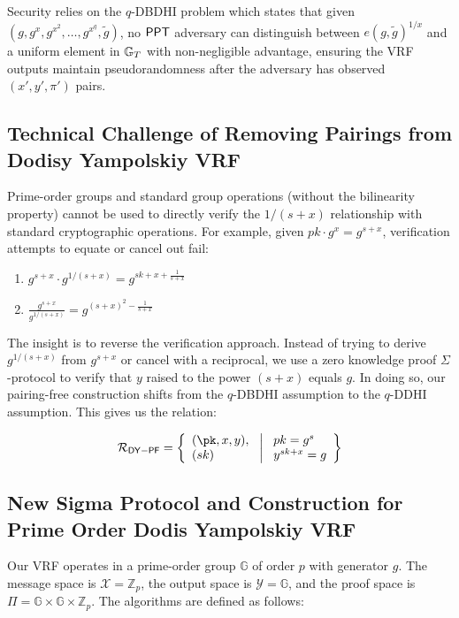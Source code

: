 Security relies on the $q$-DBDHI problem which states that given $(g, g^x, g^{x^2}, \ldots, g^{x^q}, \tilde{g})$, no $\mathsf{PPT}$ adversary can distinguish between $e(g,\tilde{g})^{1/x}$ and a uniform element in $\mathbb{G}_T$ with non-negligible advantage, ensuring the VRF outputs maintain pseudorandomness after the adversary has observed $(x',y',\pi')$ pairs.

\subsection{Technical Challenge of Removing Pairings from Dodisy Yampolskiy VRF}

Prime-order groups and standard group operations (without the bilinearity property) cannot be used to directly verify the $1/(s+x)$ relationship with standard cryptographic operations. For example, given $pk  \cdot g^x = g^{s+x}$, verification attempts to equate or cancel out fail:

\begin{enumerate}
    \item $g^{s+x} \cdot g^{1/(s+x)} = g^{sk + x + \frac{1}{s+x}}$
    \item $\frac{g^{s+x}}{g^{1/(s+x)}} = g^{(s+x)^2-\frac{1}{s+x}}$
\end{enumerate}

The insight is to reverse the verification approach. Instead of trying to derive $g^{1/(s+x)}$ from $g^{s+x}$ or cancel with a reciprocal, we use a zero knowledge proof $\Sigma$-protocol to verify that $y$ raised to the power $(s+x)$ equals $g$. In doing so, our pairing-free construction shifts from the $q$-DBDHI assumption to the $q$-DDHI assumption. This gives us the relation:

\[
\mathcal{R}_{\mathsf{DY-PF}} = \left\{ 
\begin{array}{l} 
(\pk, x, y),\\
(sk) 
\end{array}
\ \middle|
\ \begin{array}{l}
pk = g^{s} \\
y^{sk + x} = g  \\
\end{array} \right\}
\]

\subsection{New Sigma Protocol and Construction for Prime Order Dodis Yampolskiy VRF}\label{sec-dy-pf}

Our VRF operates in a prime-order group $\mathbb{G}$ of order $p$ with generator $g$. The message space is $\mathcal{X} = \mathbb{Z}_p$, the output space is $\mathcal{Y} = \mathbb{G}$, and the proof space is $\Pi = \mathbb{G} \times \mathbb{G} \times \mathbb{Z}_p$. The algorithms are defined as follows:

